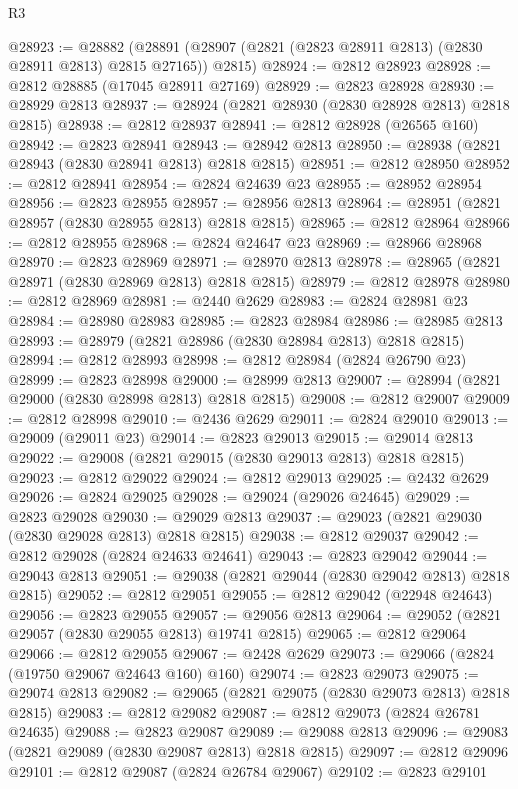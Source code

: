 \begin{lexlean}{R3}
\begin{coremodule}
@28923 := @28882
    (@28891 (@28907 (@2821 (@2823 @28911 @2813) (@2830 @28911 @2813) @2815 @27165)) @2815)
@28924 := @2812 @28923
@28928 := @2812 @28885 (@17045 @28911 @27169)
@28929 := @2823 @28928
@28930 := @28929 @2813
@28937 := @28924 (@2821 @28930 (@2830 @28928 @2813) @2818 @2815)
@28938 := @2812 @28937
@28941 := @2812 @28928 (@26565 @160)
@28942 := @2823 @28941
@28943 := @28942 @2813
@28950 := @28938 (@2821 @28943 (@2830 @28941 @2813) @2818 @2815)
@28951 := @2812 @28950
@28952 := @2812 @28941
@28954 := @2824 @24639 @23
@28955 := @28952 @28954
@28956 := @2823 @28955
@28957 := @28956 @2813
@28964 := @28951 (@2821 @28957 (@2830 @28955 @2813) @2818 @2815)
@28965 := @2812 @28964
@28966 := @2812 @28955
@28968 := @2824 @24647 @23
@28969 := @28966 @28968
@28970 := @2823 @28969
@28971 := @28970 @2813
@28978 := @28965 (@2821 @28971 (@2830 @28969 @2813) @2818 @2815)
@28979 := @2812 @28978
@28980 := @2812 @28969
@28981 := @2440 @2629
@28983 := @2824 @28981 @23
@28984 := @28980 @28983
@28985 := @2823 @28984
@28986 := @28985 @2813
@28993 := @28979 (@2821 @28986 (@2830 @28984 @2813) @2818 @2815)
@28994 := @2812 @28993
@28998 := @2812 @28984 (@2824 @26790 @23)
@28999 := @2823 @28998
@29000 := @28999 @2813
@29007 := @28994 (@2821 @29000 (@2830 @28998 @2813) @2818 @2815)
@29008 := @2812 @29007
@29009 := @2812 @28998
@29010 := @2436 @2629
@29011 := @2824 @29010
@29013 := @29009 (@29011 @23)
@29014 := @2823 @29013
@29015 := @29014 @2813
@29022 := @29008 (@2821 @29015 (@2830 @29013 @2813) @2818 @2815)
@29023 := @2812 @29022
@29024 := @2812 @29013
@29025 := @2432 @2629
@29026 := @2824 @29025
@29028 := @29024 (@29026 @24645)
@29029 := @2823 @29028
@29030 := @29029 @2813
@29037 := @29023 (@2821 @29030 (@2830 @29028 @2813) @2818 @2815)
@29038 := @2812 @29037
@29042 := @2812 @29028 (@2824 @24633 @24641)
@29043 := @2823 @29042
@29044 := @29043 @2813
@29051 := @29038 (@2821 @29044 (@2830 @29042 @2813) @2818 @2815)
@29052 := @2812 @29051
@29055 := @2812 @29042 (@22948 @24643)
@29056 := @2823 @29055
@29057 := @29056 @2813
@29064 := @29052 (@2821 @29057 (@2830 @29055 @2813) @19741 @2815)
@29065 := @2812 @29064
@29066 := @2812 @29055
@29067 := @2428 @2629
@29073 := @29066 (@2824 (@19750 @29067 @24643 @160) @160)
@29074 := @2823 @29073
@29075 := @29074 @2813
@29082 := @29065 (@2821 @29075 (@2830 @29073 @2813) @2818 @2815)
@29083 := @2812 @29082
@29087 := @2812 @29073 (@2824 @26781 @24635)
@29088 := @2823 @29087
@29089 := @29088 @2813
@29096 := @29083 (@2821 @29089 (@2830 @29087 @2813) @2818 @2815)
@29097 := @2812 @29096
@29101 := @2812 @29087 (@2824 @26784 @29067)
@29102 := @2823 @29101

\end{coremodule}
\end{lexlean}
